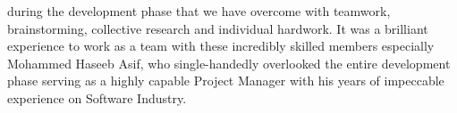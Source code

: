 during the development phase that we have overcome with teamwork, brainstorming, collective research and individual hardwork. It was a brilliant experience to work as a team with these incredibly skilled members especially Mohammed Haseeb Asif, who single-handedly overlooked the entire development phase serving as a highly capable Project Manager with his years of impeccable experience on Software Industry.
